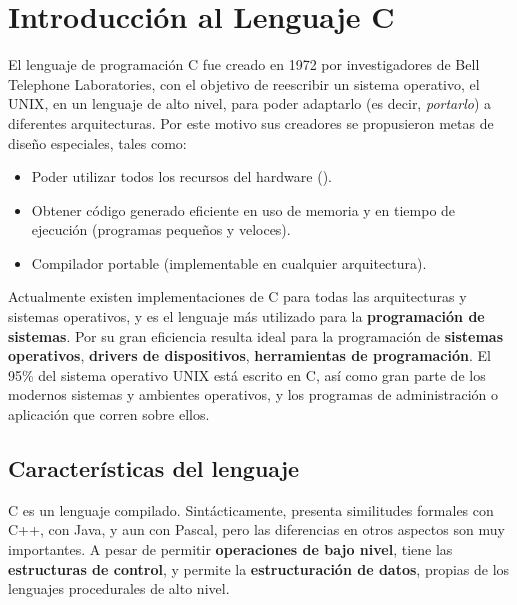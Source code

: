 
\chapter{Introducción al Lenguaje C}


El lenguaje de programación C fue creado en 1972 por investigadores de 
Bell Telephone Laboratories, con el objetivo de reescribir un sistema
operativo, el UNIX, en un lenguaje de alto nivel, para poder adaptarlo
(es decir, \textit{portarlo}) a diferentes arquitecturas. Por este motivo sus
creadores se propusieron metas de diseño especiales, tales como: 

\begin{itemize}
\item Poder utilizar todos los recursos del hardware (). 
\item Obtener código generado eficiente en uso de memoria y en tiempo de ejecución (programas pequeños y veloces).
\item Compilador portable (implementable en cualquier arquitectura).
\end{itemize}


Actualmente existen implementaciones de C para todas las arquitecturas y
sistemas operativos, y es el lenguaje más utilizado para la
\textbf{programación de sistemas}. Por su gran eficiencia resulta ideal para
la programación de \textbf{sistemas operativos}, \textbf{drivers de dispositivos},
\textbf{herramientas de programación}. El 95\% del sistema operativo UNIX
está escrito en C, así como gran parte de los modernos
sistemas y ambientes operativos, y los programas de administración o aplicación que corren
sobre ellos.


\section{Características del lenguaje}
C es un lenguaje compilado. Sintácticamente, presenta similitudes formales 
con C++, con Java, y aun con Pascal, pero las diferencias en otros aspectos son muy
importantes. A pesar de permitir \textbf{operaciones de bajo nivel}, tiene las
\textbf{estructuras de control}, y permite la \textbf{estructuración de datos}, propias
de los lenguajes procedurales de alto nivel. 

